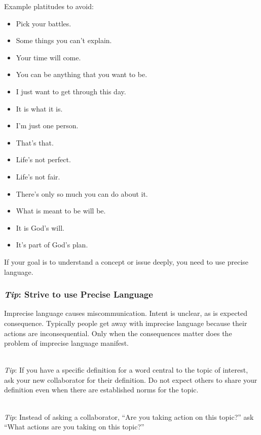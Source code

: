 Example platitudes to avoid:
\begin{itemize}
    \item Pick your battles.
    \item Some things you can't explain.
    \item Your time will come.
    \item You can be anything that you want to be.
    \item I just want to get through this day.
    \item It is what it is.
    \item I'm just one person.
    \item That's that.
    \item Life's not perfect.
    \item Life's not fair.
    \item There's only so much you can do about it.
    \item What is meant to be will be.
    \item It is God's will.
    \item It's part of God's plan.
\end{itemize}

If your goal is to understand a concept or issue deeply, you need to use precise language.

\subsubsection*{\textit{Tip}: Strive to use Precise Language}

Imprecise language causes miscommunication. Intent is unclear, as is expected consequence. Typically people get away with imprecise language because their actions are inconsequential. Only when the consequences matter does the problem of imprecise language manifest.

\ \\
\textit{Tip}: If you have a specific definition for a word central to the topic of interest, ask your new collaborator for their definition. Do not expect others to share your definition even when there are established norms for the topic. 

\ \\
\textit{Tip}: Instead of asking a collaborator, ``Are you taking action on this topic?'' ask ``What actions are you taking on this topic?''

